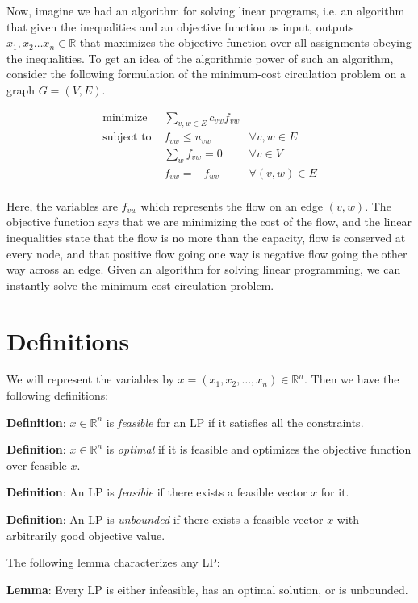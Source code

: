 \documentclass{article}
\newcommand{\reals}{\mathbb{R}}
\begin{document}
Now, imagine we had an algorithm for solving linear programs, i.e. an
algorithm that given the inequalities and an objective function as
input, outputs $x_1, x_2 \dots x_n \in \reals$ that maximizes the
objective function over all assignments obeying the inequalities.  To
get an idea of the algorithmic power of such an algorithm, consider
the following formulation of the minimum-cost circulation problem on a
graph $G=(V,E)$.

\begin{eqnarray*}
  \textrm{minimize } & \sum_{v,w \in E} c_{vw} f_{vw} &\\
  \textrm{subject to } & f_{vw} \leq u_{vw} & \forall v,w \in E\\
  & \sum_{w} f_{vw} = 0 & \forall v \in V\\
  & f_{vw} = -f_{wv} & \forall (v,w) \in E\\
\end{eqnarray*}

Here, the variables are $f_{vw}$ which represents the flow on an edge
$(v,w)$.  The objective function says that we are minimizing the cost
of the flow, and the linear inequalities state that the flow is no more than the capacity, flow is conserved at every node, and that
positive flow going one way is negative flow going the other way
across an edge.  Given an algorithm for solving linear programming, we
can instantly solve the minimum-cost circulation problem.

\section{Definitions}

We will represent the variables by $x = (x_1, x_2, \dots, x_n) \in
\reals^n$.  Then we have the following definitions:

\textbf{Definition}:
$x \in \reals^n$ is \emph{feasible} for an LP if it satisfies all
the constraints.

  
\textbf{Definition}:
$x \in \reals^n$ is \emph{optimal} if it is feasible and optimizes
the objective function over feasible $x$.

\textbf{Definition}:
  An LP is \emph{feasible} if there exists a feasible vector $x$ for
  it.

\textbf{Definition}:
  An LP is \emph{unbounded} if there exists a feasible vector $x$ with
  arbitrarily good objective value.

The following lemma characterizes any LP:

  \textbf{Lemma}:
  Every LP is either infeasible, has an optimal solution, or is unbounded.
\end{document}

